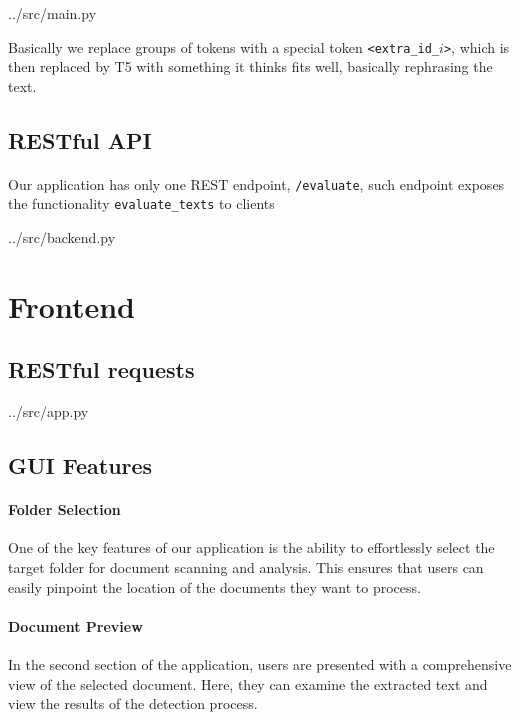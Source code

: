 
{../src/main.py}

Basically we replace groups of tokens with a special token \texttt{<extra\_id\_$i$>}, which is then replaced by T5 with something it thinks fits well, basically rephrasing the text.

\subsection{RESTful API}

\paragraph{}
Our application has only one REST endpoint, \texttt{/evaluate}, such endpoint exposes the functionality \texttt{evaluate\_texts} to clients


{../src/backend.py}

\section{Frontend}

\subsection{RESTful requests}


{../src/app.py}

\subsection{GUI Features}

\paragraph{Folder Selection} One of the key features of our application is the ability to effortlessly select the 
target folder for document scanning and analysis. This ensures that users can easily pinpoint the location of the 
documents they want to process.

\paragraph{Document Preview} In the second section of the application, users are presented with a comprehensive 
view of the selected document. Here, they can examine the extracted text and view the results of the detection process.

